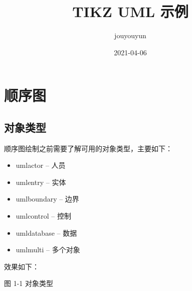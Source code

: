 \documentclass{ctexart}
\title{TIKZ UML 示例}
\author{jouyouyun}
\date{2021-04-06}
\begin{document}
\maketitle
\tableofcontents
\newpage

\section{顺序图}
\subsection{对象类型}
顺序图绘制之前需要了解可用的对象类型，主要如下：
\begin{itemize}[leftmargin=4em]
\item umlactor -- 人员
\item umlentry -- 实体
\item umlboundary -- 边界
\item umlcontrol -- 控制
\item umldatabase -- 数据
\item umlmulti -- 多个对象
\end{itemize}

效果如下：
\begin{center}

  图 1-1 对象类型
\end{center}
\end{document}
